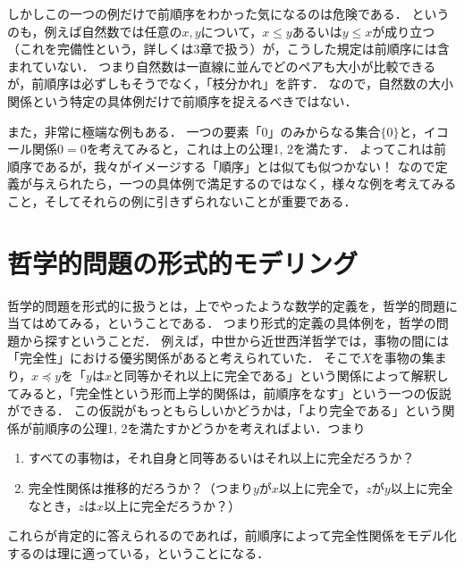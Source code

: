 \documentclass[11pt,a4paper]{jsarticle}
\begin{document}
しかしこの一つの例だけで前順序をわかった気になるのは危険である．
というのも，例えば自然数では任意の$x,y$について，$x \leq y$あるいは$y \leq x$が成り立つ（これを完備性という，詳しくは3章で扱う）が，こうした規定は前順序には含まれていない．
つまり自然数は一直線に並んでどのペアも大小が比較できるが，前順序は必ずしもそうでなく，「枝分かれ」を許す．
なので，自然数の大小関係という特定の具体例だけで前順序を捉えるべきではない．

また，非常に極端な例もある．
一つの要素「0」のみからなる集合$\{ 0 \}$と，イコール関係$0 = 0$を考えてみると，これは上の公理1, 2を満たす．
よってこれは前順序であるが，我々がイメージする「順序」とは似ても似つかない！
なので定義が与えられたら，一つの具体例で満足するのではなく，様々な例を考えてみること，そしてそれらの例に引きずられないことが重要である．




\section{哲学的問題の形式的モデリング}

哲学的問題を形式的に扱うとは，上でやったような数学的定義を，哲学的問題に当てはめてみる，ということである．
つまり形式的定義の具体例を，哲学の問題から探すということだ．
例えば，中世から近世西洋哲学では，事物の間には「完全性」における優劣関係があると考えられていた．
そこで$X$を事物の集まり，$x \preceq y$を「$y$は$x$と同等かそれ以上に完全である」という関係によって解釈してみると，「完全性という形而上学的関係は，前順序をなす」という一つの仮説ができる．
この仮説がもっともらしいかどうかは，「より完全である」という関係が前順序の公理1, 2を満たすかどうかを考えればよい．つまり
\begin{enumerate}
 \item すべての事物は，それ自身と同等あるいはそれ以上に完全だろうか？
 \item 完全性関係は推移的だろうか？（つまり$y$が$x$以上に完全で，$z$が$y$以上に完全なとき，$z$は$x$以上に完全だろうか？）
\end{enumerate}
これらが肯定的に答えられるのであれば，前順序によって完全性関係をモデル化するのは理に適っている，ということになる．
\end{document}
